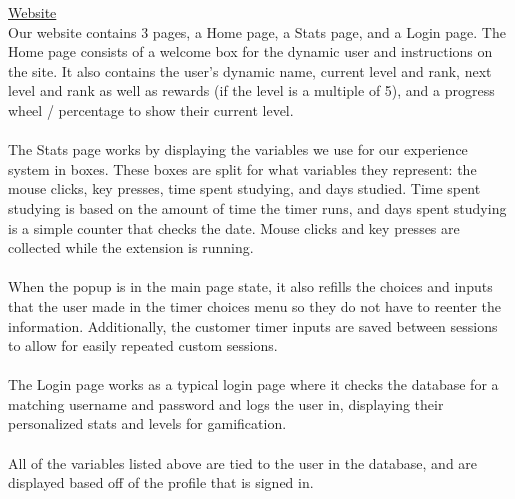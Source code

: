 \documentclass[12pt]{article}
\begin{document}
\noindent \underline{Website} \\
Our website contains 3 pages, a Home page, a Stats page, and a Login page. The Home page consists of a welcome box for the dynamic user and instructions on the site. It also contains the user’s dynamic name, current level and rank, next level and rank as well as rewards (if the level is a multiple of 5), and a progress wheel / percentage to show their current level.
\\\\The Stats page works by displaying the variables we use for our experience system in boxes. These boxes are split for what variables they represent: the mouse clicks, key presses, time spent studying, and days studied. Time spent studying is based on the amount of time the timer runs, and days spent studying is a simple counter that checks the date. Mouse clicks and key presses are collected while the extension is running. 
\\\\When the popup is in the main page state, it also refills the choices and inputs that the user made 
in the timer choices menu so they do not have to reenter the information. Additionally, the customer timer inputs are saved between sessions to 
allow for easily repeated custom sessions. 
\\\\The Login page works as a typical login page where it checks the database for a matching username and password and logs the user in, displaying their personalized stats and levels for gamification.
\\\\All of the variables listed above are tied to the user in the database, and are displayed based off of the profile that is signed in.
\\\\
\end{document}
